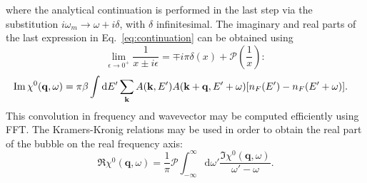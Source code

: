 \documentclass[preprint,prb,amsmath,superscriptaddress,showpacs]{revtex4}
\newcommand{\bk}{\mathbf{k}}
\newcommand{\bq}{\mathbf{q}}
\begin{document}
where the analytical continuation is performed in the last step via the
substitution $i\omega_m \rightarrow \omega + i\delta$, with $\delta$
infinitesimal. The imaginary and real parts of the last expression in
Eq.~\ref{eq:continuation} can be obtained using
%
\begin{equation}
  \lim_{\epsilon \rightarrow 0^{+}} \frac{1}{x \pm i\epsilon} = \mp
  i\pi\delta (x) + \mathcal{P}\left( \frac{1}{x} \right):
\end{equation}
%
\begin{equation}
  \begin{aligned}
    \Im \chi^0(\bq, \omega)
    &= \pi \beta
    \int
    \mathrm{d} E'
    \sum_{\bk} A(\bk, E') 
    A(\bk + \bq, E' + \omega)
    \qty[n_F(E') - n_F(E' + \omega) ].
    \end{aligned}
\end{equation}
This convolution in frequency and wavevector may be computed
efficiently using FFT. The Kramers-Kronig relations may be used in
order to obtain the real part of the bubble on the real frequency axis:
%
\begin{equation}
  \Re \chi^0(\bq, \omega) =
  \dfrac{1}{\pi} \mathcal{P}
  \int_{-\infty}^{\infty}
  \mathrm{d} \omega' \frac{\Im \chi^0(\bq, \omega)}{\omega' - \omega}.
\end{equation}
%

\iffalse
Using RPA approximation we can further write spectral function
$A(\mathbf{k}, E)$ as
%
\begin{equation}
A(\mathbf{k}, E) = - \frac{1}{\pi} \mathrm{Im} (G_{\mathrm{ret}}(\mathbf{k}, E)) =
\frac{1}{\pi} \frac{-\mathrm{Im}(\Sigma)}{\left( E -
    \varepsilon_{\mathbf{k}} + \mu - \mathrm{Re}(\Sigma) \right)^2 + (\mathrm{Im}(\Sigma))^2}.
\end{equation}
%
Here, $\Sigma$ marks RPA self-energy.
\fi


\end{document}
